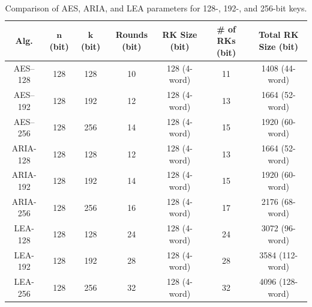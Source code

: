 \documentclass[11pt,a4paper]{report}
\theoremstyle{definitionstyle}
\begin{document}
\begin{table}[h!]
	\centering{}
	\begin{tabular*}{\textwidth}{@{\extracolsep{\fill}}ccccccc}
		\hline
		\textbf{Alg.} & $\boldsymbol{n}$ (bit) & $\boldsymbol{k}$ (bit) & \textbf{Rounds} (bit) & \textbf{RK Size} (bit) & \textbf{\# of RKs} (bit) & \textbf{Total RK Size} (bit) \\
		\hline
		\textsf{AES--128} & 128 & 128 & 10 & 128 (4-word) & 11 & 1408 (44-word) \\
		\textsf{AES--192} & 128 & 192 & 12 & 128 (4-word) & 13 & 1664 (52-word)\\
		\textsf{AES--256} & 128 & 256 & 14 & 128 (4-word) & 15 & 1920 (60-word)\\
		\hline
		\textsf{ARIA-128} & 128 & 128 & 12 & 128 (4-word) & 13 & 1664 (52-word)\\
		\textsf{ARIA-192} & 128 & 192 & 14 & 128 (4-word) & 15 & 1920 (60-word)\\
		\textsf{ARIA-256} & 128 & 256 & 16 & 128 (4-word) & 17 & 2176 (68-word)\\
		\hline
		\textsf{LEA-128} & 128 & 128 & 24 & 128 (4-word) & 24 & 3072 (96-word)\\
		\textsf{LEA-192} & 128 & 192 & 28 & 128 (4-word) & 28 & 3584 (112-word)\\
		\textsf{LEA-256} & 128 & 256 & 32 & 128 (4-word) & 32 & 4096 (128-word)\\
		\hline
	\end{tabular*}
	\caption{Comparison of AES, ARIA, and LEA parameters for 128-, 192-, and 256-bit keys. 
	}
	\label{tab:cipher-comparison}
\end{table}
\end{document}
